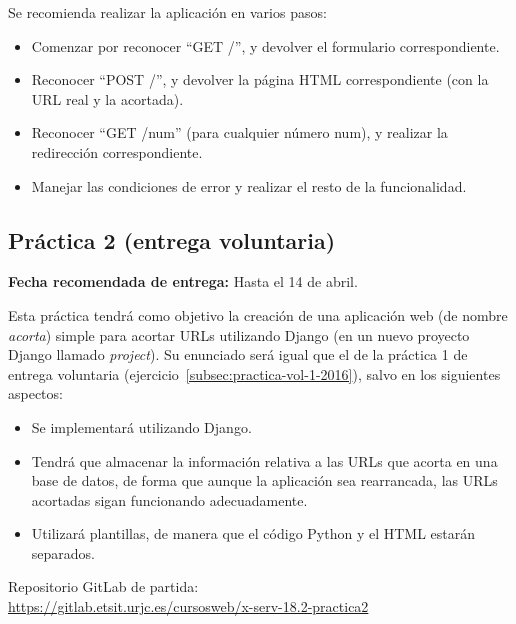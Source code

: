 Se recomienda realizar la aplicación en varios pasos:

\begin{itemize}
\item Comenzar por reconocer ``GET /'', y devolver el formulario correspondiente.
\item Reconocer ``POST /'', y devolver la página HTML correspondiente (con la URL real y la acortada).
\item Reconocer ``GET /num'' (para cualquier número num), y realizar la redirección correspondiente.
\item Manejar las condiciones de error y realizar el resto de la funcionalidad.
\end{itemize}

\subsection{Práctica 2 (entrega voluntaria)}
\label{subsec:practica-vol-2-2015}

\textbf{Fecha recomendada de entrega:} Hasta el 14 de abril.

Esta práctica tendrá como objetivo la creación de una aplicación web (de nombre \emph{acorta}) simple para acortar URLs utilizando Django (en un nuevo proyecto Django llamado \emph{project}). Su enunciado será igual que el de la práctica 1 de entrega voluntaria (ejercicio~\ref{subsec:practica-vol-1-2016}), salvo en los siguientes aspectos:

\begin{itemize}
  \item Se implementará utilizando Django.
  \item Tendrá que almacenar la información relativa a las URLs que acorta en una base de datos, de forma que aunque la aplicación sea rearrancada, las URLs acortadas sigan funcionando adecuadamente.
  \item Utilizará plantillas, de manera que el código Python y el HTML estarán separados.
\end{itemize}


Repositorio GitLab de partida: \\
\url{https://gitlab.etsit.urjc.es/cursosweb/x-serv-18.2-practica2}

